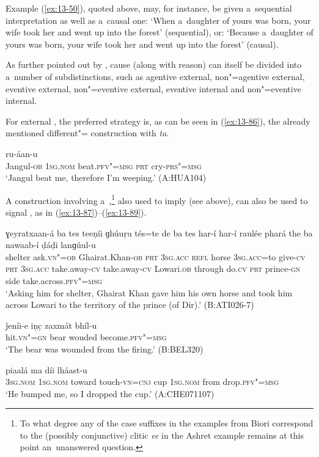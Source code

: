 Example (\ref{ex:13-50}), quoted above, may, for instance, be given a~sequential interpretation as well as a~causal one: `When a~daughter of yours was born, your wife took her and went up into the forest' (sequential), or: `Because a~daughter of yours was born, your wife took her and went up into the forest' (causal).



As further pointed out by \citet[335]{givon2001b}, cause (along with reason) can itself be divided into a~number of subdistinctions, such as agentive external, non"=agentive external, eventive external, non"=eventive external, eventive internal and non"=eventive internal.



For external , the preferred strategy is, as can be seen in (\ref{ex:13-86}), the already mentioned  different"= construction with \textit{ta}.

\begin{exe}
\ex
\label{ex:13-86}
 ru-áan-u  \\
Jangul-\textsc{ob} \textsc{1sg.nom} beat.\textsc{pfv"=msg} \textsc{prt} cry-\textsc{prs"=msg}  \\
\glt `Jangul beat me, therefore I'm weeping.' (A:HUA104)
\end{exe}

A construction involving a~,\footnote{To what degree any of the case suffixes in the examples from Biori correspond to the (possibly conjunctive) clitic \textit{ee} in the Ashret example remains at this point an~unanswered question.} also used to imply  (see above), can also be used to signal , as in (\ref{ex:13-87})--(\ref{ex:13-89}).

\begin{exe}
\ex
\label{ex:13-87}
 ɣeyratxaan-á ba tes teeṇíi ɡhúuṛu tés=te de ba tes har-í har-í raulée phará the ba nawaab-í ḍáḍi lanɡúul-u \\
shelter ask.\textsc{vn"=ob} Ghairat.Khan-\textsc{ob} \textsc{prt} \textsc{3sg.acc} \textsc{refl}  horse \textsc{3sg.acc}=to give-\textsc{cv} \textsc{prt} \textsc{3sg.acc} take.away-\textsc{cv} take.away-\textsc{cv} Lowari.\textsc{ob} through do.\textsc{cv} \textsc{prt} prince-\textsc{gn} side take.across.\textsc{pfv"=msg} \\
\glt `Asking him for shelter, Ghairat Khan gave him his own horse and took him across Lowari to the territory of the prince (of Dir).' (B:ATI026-7)

\ex
\label{ex:13-88}
\gll ǰeníi-e iṇc̣ zaxmát bhíl-u \\
hit.\textsc{vn"=gn} bear wouded become.\textsc{pfv"=msg} \\
\glt `The bear was wounded from the firing.' (B:BEL320)

\ex
\label{ex:13-89}
\gll [so ma pharé ḍhak"=ainíi=ee] piaalá ma díi lháast-u \\
\textsc{3sg.nom} \textsc{1sg.nom} toward touch-\textsc{vn=cnj} cup \textsc{1sg.nom} from drop.\textsc{pfv"=msg}  \\
\glt `He bumped me, so I dropped the cup.' (A:CHE071107) 
\end{exe}

